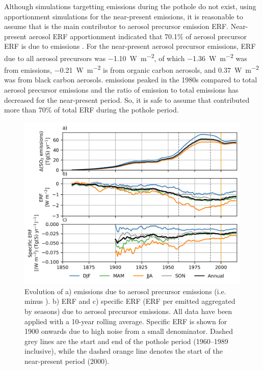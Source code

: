 Although simulations targetting  emissions during the pothole do not exist, using apportionment simulations for the near-present emissions, it is reasonable to assume that  is the main contributor to aerosol precursor emission ERF. Near-present aerosol ERF apportionment indicated that 70.1\% of aerosol precursor ERF is due to  emissions \citep{thornhillEffectiveRadiativeForcing2021}. For the near-present aerosol precursor emissions, ERF due to all aerosol precursors was \qty{-1.10}{W~m^{-2}}, of which \qty{-1.36}{W~m^{-2}} was from  emissions, \qty{-0.21}{W~m^{-2}} is from organic carbon aerosols, and \qty{0.37}{W~m^{-2}} was from black carbon aerosols.  emissions peaked in the 1980s compared to total aerosol precursor emissions  \citep{hoeslyHistorical175020142018} and the ratio of  emission to total emissions has decreased for the near-present period. So, it is safe to assume that  contributed more than 70\% of total ERF during the pothole period.

\begin{figure}
    \centering
    \includegraphics{Chapter4/Figs/seasonal_specific_erf.png}
    \caption[Specific ERF aggregated by seasons between 1900--2014]{Evolution of a)  emissions due to aerosol precursor emissions (i.e. \histsst{} minus \sstpiaer{}). b) ERF and c) specific ERF (ERF per emitted  aggregated by seasons) due to aerosol precursor emissions. All data have been applied with a 10-year rolling average. Specific ERF is shown for 1900 onwards due to high noise from a small denominator. Dashed grey lines are the start and end of the pothole period (1960--1989 inclusive), while the dashed orange line denotes the start of the near-present period (2000).}
    \label{fig:ch4:specific-erf}
\end{figure}

